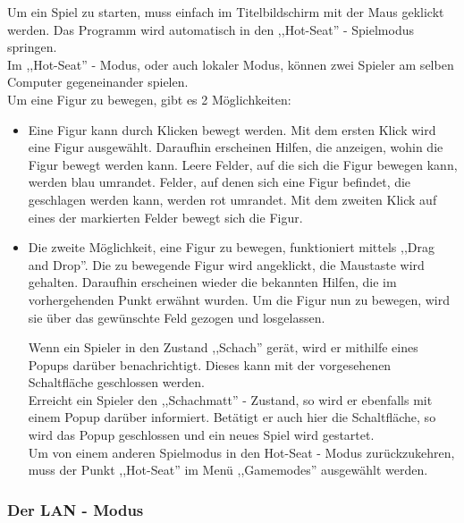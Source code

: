 \documentclass[12pt,a4paper]{article}
\begin{document}
 Um ein Spiel zu starten, muss einfach im Titelbildschirm mit der Maus geklickt werden. Das Programm wird automatisch in den ,,Hot-Seat'' - Spielmodus springen.\\
Im ,,Hot-Seat'' - Modus, oder auch lokaler Modus, können zwei Spieler am selben Computer gegeneinander spielen. \\
Um eine Figur zu bewegen, gibt es 2 Möglichkeiten:
\begin{itemize}

	\item{Eine Figur kann durch Klicken bewegt werden. Mit dem ersten Klick wird eine Figur ausgewählt. Daraufhin erscheinen Hilfen, die anzeigen, wohin die Figur bewegt werden kann. Leere Felder, auf die sich die Figur bewegen kann, werden blau umrandet. Felder, auf denen sich eine Figur befindet, die geschlagen werden kann, werden rot umrandet. Mit dem zweiten Klick auf eines der markierten Felder bewegt sich die Figur.}
	
	\item{Die zweite Möglichkeit, eine Figur zu bewegen, funktioniert mittels ,,Drag and Drop''. Die zu bewegende Figur wird angeklickt, die Maustaste wird gehalten. Daraufhin erscheinen wieder die bekannten Hilfen, die im vorhergehenden Punkt erwähnt wurden. Um die Figur nun zu bewegen, wird sie über das gewünschte Feld gezogen und losgelassen.

Wenn ein Spieler in den Zustand ,,Schach'' gerät, wird er mithilfe eines Popups darüber benachrichtigt. Dieses kann mit der vorgesehenen Schaltfläche geschlossen werden.\\
Erreicht ein Spieler den ,,Schachmatt'' - Zustand, so wird er ebenfalls mit einem Popup darüber informiert. Betätigt er auch hier die Schaltfläche, so wird das Popup geschlossen und ein neues Spiel wird gestartet. \\
Um von einem anderen Spielmodus in den Hot-Seat - Modus zurückzukehren, muss der Punkt ,,Hot-Seat'' im Menü ,,Gamemodes'' ausgewählt werden.
	}

\end{itemize}
	
	\subsubsection{Der LAN - Modus}
	\label{SUBSUBSEC:USERDOCLAN}
	
\end{document}

